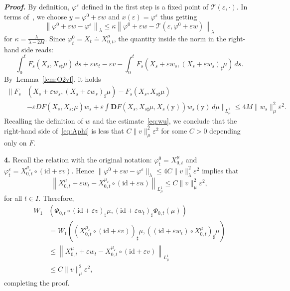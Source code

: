 \documentclass[sn-mathphys-num]{sn-jnl}
\numberwithin{equation}{section}
\theoremstyle{mythm}
\theoremstyle{mydef}
\renewenvironment{proof}{\smallskip\noindent\emph{\textbf{Proof.}}%
  \hspace{1pt}}{\hspace{-5pt}{\nobreak\quad\nobreak\hfill\nobreak%
    $\square$\vspace{2pt}\par}\smallskip\goodbreak}
\renewcommand{\phi}{\varphi}
\renewcommand{\d}{\,d}
\newcommand{\id}{\mathrm{id}}
\renewcommand{\mathbf}[1]{\bm{#1}}
\begin{document}
\begin{proof}
By definition, \( \phi^{\varepsilon} \) defined in the first step is a fixed point of \( \mathcal{T}(\varepsilon,\cdot) \).
In terms of~\cite[Theorem A.2.1]{ABressan_BPiccoli_2007a}, we choose \( y = \phi^0 + \varepsilon w \) and \( x(\varepsilon) = \phi^{\varepsilon} \) thus getting
\begin{equation}
  \label{eq:Aphi}
\left\|\phi^0+\varepsilon w - \phi^{\varepsilon}\right\|_{\lambda} \le \kappa \left\|\phi^0+ \varepsilon w - \mathcal{T}\left(\varepsilon,\phi^0+\varepsilon w\right)\right\|_{\lambda}
\end{equation}
for \( \kappa = \frac{\lambda}{\lambda-2M} \).
Since \( \phi^0_t = X_t\doteq X^{\mu}_{0,t} \), the quantity inside the norm in the right-hand side reads:
\[
 \int_0^t F_s\left(X_s, X_{s\sharp}\mu\right)\d s + \varepsilon w_t - \varepsilon v - \int_0^t F_s\left(X_s+\varepsilon w_{s}, (X_s+\varepsilon w_s)_{\sharp}\mu\right)\d s.
\]
By~Lemma~\ref{lem:O2vf}, it holds
\begin{align*}
  \Big\|
F_s&\left(X_s+\varepsilon w_{s}, (X_s+\varepsilon w_s)_{\sharp}\mu\right)-
  F_s\left(X_s, X_{s\sharp}\mu\right) \\
  &-
  \varepsilon DF\left(X_s,X_{s\sharp}\mu\right)w_s + \varepsilon\int \mathbf{D}F\left(X_s,X_{s\sharp}\mu,X_s(\mathrm{y})\right)w_s(\mathrm{y})\d \mu\Big\|_{L^1_{\mu}} \le 4M\|w_s\|^2_{\mu}\varepsilon^{2}.
\end{align*}
Recalling the definition of \( w \) and the estimate~\eqref{eq:wu}, we conclude that the right-hand side of~\eqref{eq:Aphi} is less that \( C\|v\|^2_{\mu}\varepsilon^{2} \) for some \( C>0 \) depending only on \( F \).

\textbf{4.} Recall the relation with the original notation: \(\phi^0_t = X^{\mu}_{0,t} \) and \( \phi^{\varepsilon}_t = X_{0,t}^{\mu_\varepsilon}\circ(\id +\varepsilon v) \).
Hence \( \|\phi^0+\varepsilon w - \phi^{\varepsilon}\|_{\lambda}\le 4C\|v\|^2_{\lambda}\varepsilon^{2} \) implies that
\[
\left\|X_{0,t}^{\mu}+\varepsilon w_t - X_{0,t}^{\mu_{\varepsilon}}\circ (\id + \varepsilon u)\right\|_{L^1_\mu}\le C\|v\|^2_{\mu}\varepsilon^{2},
\]
for all \( t\in I \).
Therefore,
\begin{align*}
  W_1&\left(\Phi_{0,t}\circ (\id + \varepsilon v)_{\sharp}\mu, (\id + \varepsilon w_t)_{\sharp} \Phi_{0,t}(\mu)\right)\\
  &=
    W_1\left(\left(X^{\mu_{\varepsilon}}_{0,t}\circ (\id + \varepsilon v)\right)_{\sharp}\mu, \left((\id + \varepsilon w_t) \circ X^{\mu}_{0,t}\right)_{\sharp}\mu\right)\\
     &\le
     \left\|X_{0,t}^{\mu}+\varepsilon w_t - X_{0,t}^{\mu_{\varepsilon}}\circ (\id + \varepsilon v)\right\|_{L^1_{\mu}}\\
  &\le C\|v\|^2_{\mu}\varepsilon^{2},
\end{align*}
completing the proof.
\end{proof}
\end{document}
